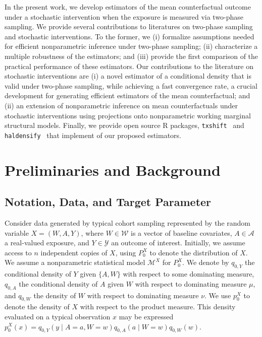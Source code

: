 In the present work, we develop estimators of the mean counterfactual outcome
under a stochastic intervention when the exposure is measured via two-phase
sampling. We provide several contributions to literatures on two-phase sampling
and stochastic interventions. To the former, we (i) formalize assumptions needed
for efficient nonparametric inference under two-phase sampling; (ii)
characterize a multiple robustness of the estimators; and (iii) provide the
first comparison of the practical performance of these estimators. Our
contributions to the literature on stochastic interventions are (i) a novel
estimator of a conditional density that is valid under two-phase sampling, while
achieving a fast convergence rate, a crucial development for generating
efficient estimators of the mean counterfactual; and (ii) an extension of
nonparametric inference on mean counterfactuals under stochastic interventions
using projections onto nonparametric working marginal structural models.
Finally, we provide open source R packages,
\texttt{txshift}~\citep{hejazi2020txshift, hejazi2020txshift-joss} and
\texttt{haldensify}~\citep{hejazi2021haldensify} that implement of our proposed
estimators.

\section{Preliminaries and Background}\label{two_background}

\subsection{Notation, Data, and Target Parameter}\label{parameter}

Consider data generated by typical cohort sampling represented by the random
variable $X = (W, A, Y)$, where $W \in \mathcal{W}$ is a vector of baseline
covariates, $A \in \mathcal{A}$ a real-valued exposure, and $Y \in \mathcal{Y}$
an outcome of interest. Initially, we assume access to $n$ independent copies of
$X$, using $P_0^X$ to denote the distribution of $X$. We assume a nonparametric
statistical model $\mathcal{M}^X$ for $P_0^X$. We denote by $q_{0, Y}$ the
conditional density of $Y$ given $\{A, W\}$ with respect to some dominating
measure, $q_{0, A}$ the conditional density of $A$ given $W$ with respect to
dominating measure $\mu$, and $q_{0, W}$ the density of $W$ with respect to
dominating measure $\nu$. We use $p_0^X$ to denote the density of $X$ with
respect to the product measure. This density evaluated on a typical observation
$x$ may be expressed $p_0^X(x) = q_{0,Y}(y \mid A = a, W = w) q_{0,A}(a \mid
W = w) q_{0,W}(w)$.

